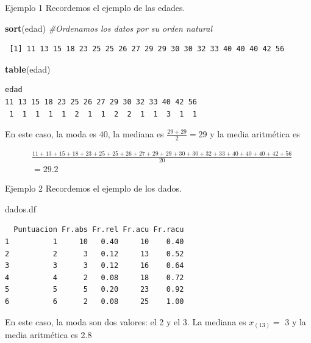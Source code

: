 \documentclass[
  ignorenonframetext,
  aspectratio=169]{beamer}
\newenvironment{Shaded}{\begin{snugshade}}{\end{snugshade}}
\newcommand{\CommentTok}[1]{\textcolor[rgb]{0.56,0.35,0.01}{\textit{#1}}}
\newcommand{\FunctionTok}[1]{\textcolor[rgb]{0.13,0.29,0.53}{\textbf{#1}}}
\newcommand{\NormalTok}[1]{#1}
\begin{document}
\begin{frame}[fragile]{Ejemplo 1}
\label{ejemplo-1-7}
Recordemos el ejemplo de las edades.

\begin{Shaded}
\begin{Highlighting}[]
\FunctionTok{sort}\NormalTok{(edad) }\CommentTok{\#Ordenamos los datos por su orden natural}
\end{Highlighting}
\end{Shaded}

\begin{verbatim}
 [1] 11 13 15 18 23 25 25 26 27 29 29 30 30 32 33 40 40 40 42 56
\end{verbatim}

\begin{Shaded}
\begin{Highlighting}[]
\FunctionTok{table}\NormalTok{(edad)}
\end{Highlighting}
\end{Shaded}

\begin{verbatim}
edad
11 13 15 18 23 25 26 27 29 30 32 33 40 42 56 
 1  1  1  1  1  2  1  1  2  2  1  1  3  1  1 
\end{verbatim}

En este caso, la moda es 40, la mediana es \(\frac{29+29}{2}=29\) y la
media aritmética es

\begin{align*}
& \frac{11+13+15+18+23+25+25+26+27+29+29+30+30+32+33+40+40+40+42+56}{20}  \\  &= 29.2
\end{align*}
\end{frame}

\begin{frame}[fragile]{Ejemplo 2}
\label{ejemplo-2-6}
Recordemos el ejemplo de los dados.

\begin{Shaded}
\begin{Highlighting}[]
\NormalTok{dados.df}
\end{Highlighting}
\end{Shaded}

\begin{verbatim}
  Puntuacion Fr.abs Fr.rel Fr.acu Fr.racu
1          1     10   0.40     10    0.40
2          2      3   0.12     13    0.52
3          3      3   0.12     16    0.64
4          4      2   0.08     18    0.72
5          5      5   0.20     23    0.92
6          6      2   0.08     25    1.00
\end{verbatim}

En este caso, la moda son dos valores: el 2 y el 3. La mediana es
\(x_{(13)}=\) 3 y la media aritmética es 2.8
\end{frame}
\end{document}
